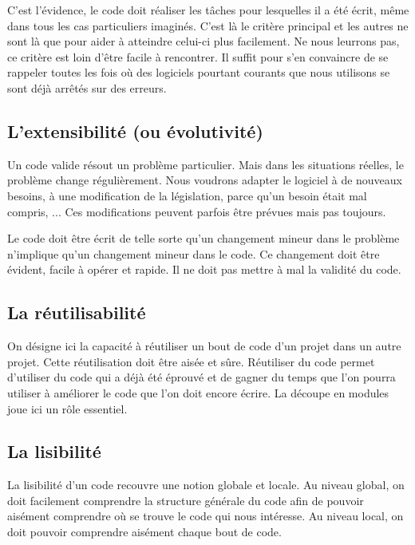 	{
	C'est l'évidence, le code doit
	réaliser les tâches pour lesquelles il a été écrit, même dans tous les
	cas particuliers imaginés. C'est là le critère
	principal et les autres ne sont là que pour aider à atteindre celui-ci
	plus facilement. Ne nous leurrons pas, ce critère est loin
	d'être facile à rencontrer. Il suffit pour
	s'en convaincre de se rappeler toutes les fois où des
	logiciels pourtant courants que nous utilisons se sont déjà arrêtés sur
	des erreurs.}

\subsection{L'extensibilité (ou évolutivité)}

	{
	Un code valide résout un problème particulier. Mais dans les situations
	réelles, le problème change régulièrement. Nous voudrons adapter le
	logiciel à de nouveaux besoins, à une modification de la législation,
	parce qu’un besoin était mal compris, ... Ces modifications peuvent
	parfois être prévues mais pas toujours.}

	{
	Le code doit être écrit de telle sorte qu'un changement
	mineur dans le problème n'implique
	qu'un changement mineur dans le code. Ce changement
	doit être évident, facile à opérer et rapide. Il ne doit pas mettre à
	mal la validité du code.}

\subsection{La réutilisabilité}

	{
	On désigne ici la capacité à réutiliser un bout de code
	d'un projet dans un autre projet. Cette réutilisation
	doit être aisée et sûre. Réutiliser du code permet
	d'utiliser du code qui a déjà été éprouvé et de gagner
	du temps que l'on pourra utiliser à améliorer le code
	que l'on doit encore écrire. La découpe en modules
	joue ici un rôle essentiel.}

\subsection{La lisibilité}

	{
	La lisibilité d'un code recouvre une notion globale et
	locale. Au niveau global, on doit facilement comprendre la structure
	générale du code afin de pouvoir aisément comprendre où se trouve le
	code qui nous intéresse. Au niveau local, on doit pouvoir comprendre
	aisément chaque bout de code.}

